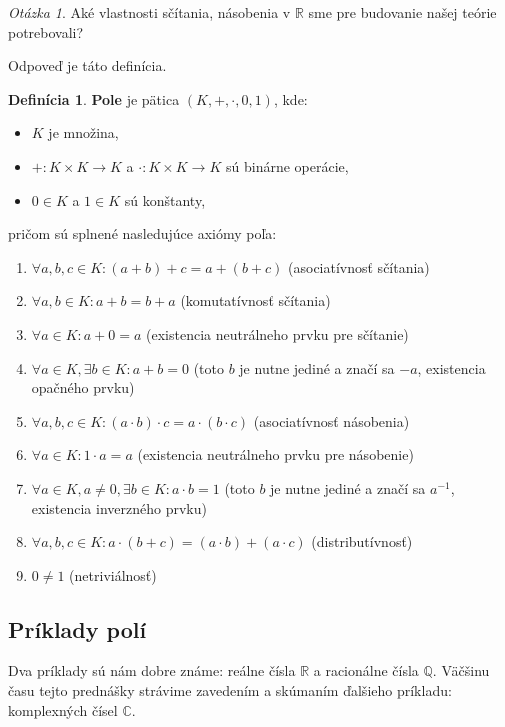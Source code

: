 \documentclass[11pt,a4paper]{article}
\theoremstyle{definition}
\newtheorem{definicia}{Definícia}[section]
\theoremstyle{plain}
\theoremstyle{remark}
\newtheorem*{question}{Otázka}
\newcommand{\R}{\mathbb{R}}
\begin{document}
\begin{question}
Aké vlastnosti sčítania, násobenia v $\R$ sme pre budovanie našej teórie potrebovali?
\end{question}
Odpoveď je táto definícia.

\begin{definicia}
\textbf{Pole} je pätica $(K, +, \cdot, 0, 1)$, kde:
\begin{itemize}
    \item $K$ je množina,
    \item $+: K \times K \to K$ a $\cdot: K \times K \to K$ sú binárne operácie,
    \item $0 \in K$ a $1 \in K$ sú konštanty,
\end{itemize}
pričom sú splnené nasledujúce axiómy poľa:
\begin{enumerate}
    \item $\forall a,b,c \in K: (a+b)+c = a+(b+c)$ (asociatívnosť sčítania)
    \item $\forall a,b \in K: a+b = b+a$ (komutatívnosť sčítania)
    \item $\forall a \in K: a+0 = a$ (existencia neutrálneho prvku pre sčítanie)
    \item $\forall a \in K, \exists b \in K: a+b=0$ (toto $b$ je nutne jediné a značí sa $-a$, existencia opačného prvku)
    \item $\forall a,b,c \in K: (a \cdot b) \cdot c = a \cdot (b \cdot c)$ (asociatívnosť násobenia)
    \item $\forall a \in K: 1 \cdot a = a$ (existencia neutrálneho prvku pre násobenie)
    \item $\forall a \in K, a \neq 0, \exists b \in K: a \cdot b = 1$ (toto $b$ je nutne jediné a značí sa $a^{-1}$, existencia inverzného prvku)
    \item $\forall a,b,c \in K: a \cdot (b+c) = (a \cdot b) + (a \cdot c)$ (distributívnosť)
    \item $0 \neq 1$ (netriviálnosť)
\end{enumerate}
\end{definicia}

\subsection*{Príklady polí}
Dva príklady sú nám dobre známe: reálne čísla $\R$ a racionálne čísla $\mathbb{Q}$. Väčšinu času tejto prednášky strávime zavedením a skúmaním ďalšieho príkladu: komplexných čísel $\mathbb{C}$.
\end{document}
